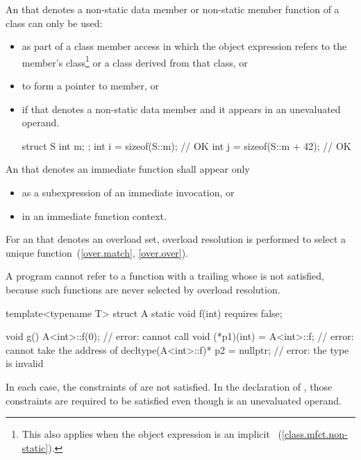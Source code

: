 \pnum
An  that denotes a non-static data member or
non-static member function of a class can only be used:
\begin{itemize}
\item as part of a class member access in which the
object expression
refers to the member's class\footnote{This also applies when the object expression
is an implicit ~(\ref{class.mfct.non-static}).} or a class derived from
that class, or

\item to form a pointer to member, or

\item if that  denotes a non-static data member
and it appears in an unevaluated operand.
\begin{example}
\begin{codeblock}
struct S {
  int m;
};
int i = sizeof(S::m);           // OK
int j = sizeof(S::m + 42);      // OK
\end{codeblock}
\end{example}
\end{itemize}

\pnum
An 
that denotes an immediate function
shall appear only
\begin{itemize}
\item as a subexpression of an immediate invocation, or
\item in an immediate function context.
\end{itemize}

\pnum
For an  that denotes an overload set,
overload resolution is performed
to select a unique function~(\ref{over.match}, \ref{over.over}).
\begin{note}
A program cannot refer to a function
with a trailing 
whose  is not satisfied,
because such functions are never selected by overload resolution.
\begin{example}
\begin{codeblock}
template<typename T> struct A {
  static void f(int) requires false;
}

void g() {
  A<int>::f(0);                         // error: cannot call 
  void (*p1)(int) = A<int>::f;          // error: cannot take the address of 
  decltype(A<int>::f)* p2 = nullptr;    // error: the type  is invalid
}
\end{codeblock}
In each case, the constraints of  are not satisfied.
In the declaration of ,
those constraints are required to be satisfied
even though
 is an unevaluated operand.
\end{example}
\end{note}

